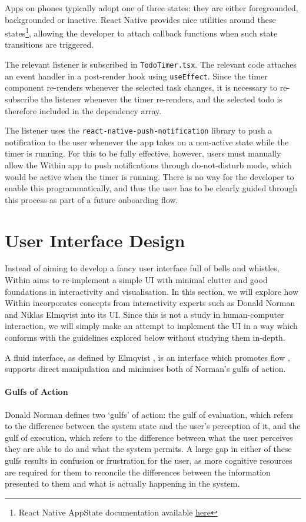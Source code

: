 Apps on phones typically adopt one of three states: they are either foregrounded, backgrounded or inactive. React Native provides nice utilities around these states\footnote{React Native AppState documentation available \href{https://reactnative.dev/docs/next/appstate}{here}}, allowing the developer to attach callback functions when such state transitions are triggered.

The relevant listener is subscribed in \texttt{TodoTimer.tsx}. The relevant code attaches an event handler in a post-render hook using \texttt{useEffect}. Since the timer component re-renders whenever the selected task changes, it is necessary to re-subscribe the listener whenever the timer re-renders, and the selected todo is therefore included in the dependency array.

The listener uses the \texttt{react-native-push-notification} library to push a notification to the user whenever the app takes on a non-active state while the timer is running. For this to be fully effective, however, users must manually allow the Within app to push notifications through do-not-disturb mode, which would be active when the timer is running. There is no way for the developer to enable this programmatically, and thus the user has to be clearly guided through this process as part of a future onboarding flow.

\section{User Interface Design}
Instead of aiming to develop a fancy user interface full of bells and whistles, Within aims to re-implement a simple UI with minimal clutter and good foundations in interactivity and visualisation. In this section, we will explore how Within incorporates concepts from interactivity experts such as Donald Norman and Niklas Elmqvist into its UI. Since this is not a study in human-computer interaction, we will simply make an attempt to implement the UI in a way which conforms with the guidelines explored below without studying them in-depth.

A fluid interface, as defined by Elmqvist \cite{elmqvist2011fluid}, is an interface which promotes flow \cite{csikszentmihalyi1990flow}, supports direct manipulation\cite{shneiderman19931} and minimises both of Norman's \cite{norman1986user} gulfs of action.

\paragraph{Gulfs of Action} Donald Norman defines two `gulfs' of action: the gulf of evaluation, which refers to the difference between the system state and the user's perception of it, and the gulf of execution, which refers to the difference between what the user perceives they are able to do and what the system permits. A large gap in either of these gulfs results in confusion or frustration for the user, as more cognitive resources are required for them to reconcile the differences between the information presented to them and what is actually happening in the system.

